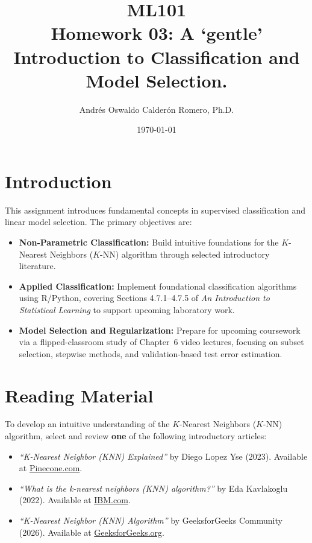 \documentclass{article}
\title{ML101 \\ Homework 03: A `gentle' Introduction to Classification and Model Selection.}
\author{Andrés Oswaldo Calderón Romero, Ph.D.}
\date{\today}
\begin{document}
\maketitle

\section{Introduction}
\label{sec:intro}

This assignment introduces fundamental concepts in supervised classification and linear model selection. The primary objectives are:

\begin{itemize}
    \item \textbf{Non-Parametric Classification:} Build intuitive foundations for the $K$-Nearest Neighbors ($K$-NN) algorithm through selected introductory literature.
    \item \textbf{Applied Classification:} Implement foundational classification algorithms using R/Python, covering Sections 4.7.1--4.7.5 of \textit{An Introduction to Statistical Learning} to support upcoming laboratory work.
    \item \textbf{Model Selection and Regularization:} Prepare for upcoming coursework via a flipped-classroom study of Chapter~6 video lectures, focusing on subset selection, stepwise methods, and validation-based test error estimation.
\end{itemize}

\section{Reading Material}
\label{sec:reading}

To develop an intuitive understanding of the $K$-Nearest Neighbors ($K$-NN) algorithm, select and review \textbf{one} of the following introductory articles:

\begin{itemize}
  \item \textit{``K-Nearest Neighbor (KNN) Explained''} by Diego Lopez Yse (2023). Available at \href{https://www.pinecone.io/learn/k-nearest-neighbor/}{Pinecone.com}.
  \item \textit{``What is the k-nearest neighbors (KNN) algorithm?''} by Eda Kavlakoglu (2022). Available at \href{https://www.ibm.com/think/topics/knn}{IBM.com}.
  \item \textit{``K-Nearest Neighbor (KNN) Algorithm''} by GeeksforGeeks Community (2026). Available at \href{https://www.geeksforgeeks.org/machine-learning/k-nearest-neighbours/}{GeeksforGeeks.org}.
\end{itemize}
\end{document}
